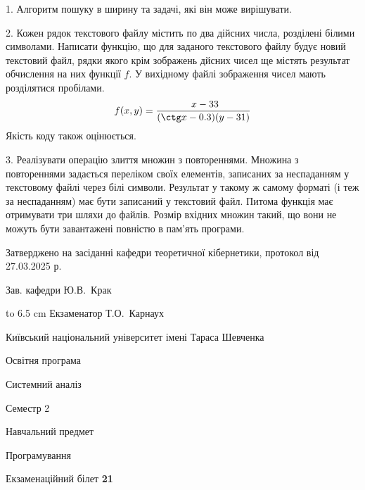 \documentclass[12pt, ukrainian]{article}
\begin{document}
{%
1. Алгоритм пошуку в ширину та задачі, які він може вирішувати.%
\par
\vspace{2mm}

2. Кожен рядок текстового файлу містить по два дійсних числа, розділені білими символами.
Написати функцію, що для заданого текстового файлу будує новий текстовий файл, рядки якого крім зображень дйсних чисел ще містять результат обчислення на них функції $f$. У вихідному файлі зображення чисел мають розділятися пробілами. 
$$f(x, y) =\frac{\ x - 33}{(\ctg x - 0.3) (y - 31)}$$ 
Якість коду також оцінюється.

\par
\vspace{2mm}

3. Реалізувати операцію злиття множин з повтореннями. Множина з повтореннями задається переліком своїх елементів, записаних за неспаданням у текстовому файлі через білі символи. Результат у такому ж самому форматі (і теж за неспаданням) має бути записаний у текстовий файл. Питома функція має отримувати три шляхи до файлів. Розмір вхідних множин такий, що вони не можуть бути завантажені повністю в пам’ять програми.

}
{\smallskip\smallskip \begin {scriptsize} Затверджено на засіданні кафедри теоретичної кібернетики, протокол   від   27.03.2025 р.\par\smallskip\smallskip\smallskip\smallskip
{\parbox {6.5 cm} {Зав. кафедри \dotfill Ю.В.~Крак}}\hspace {0.7cm} {\hbox to 6.5 cm { Екзаменатор \dotfill Т.О.~Карнаух}} \end{scriptsize}}
\newpage
{{\begin {scriptsize}\par
{ \center  Київський національний університет імені Тараса Шевченка \par}
{\parbox {5 cm}{Освітня програма \hfill}{\parbox {7 cm}{Системний аналіз\hfill}}\parbox {6 cm}{\hfill Семестр 2}}\par
{\parbox {5 cm} {Навчальний предмет \hfill}\parbox {7 cm}{Програмування \hfill}\parbox {6cm}{\hfill}\par}\vspace{-15pt} \end{scriptsize}}{\center Екзаменаційний білет \No \textbf { 21 }\par}}
\end{document}
